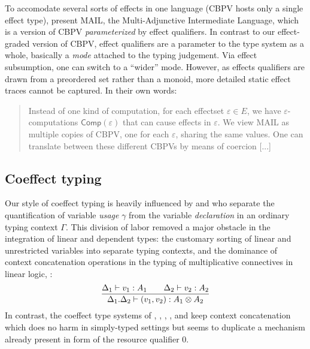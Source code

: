 \documentclass[acmsmall,review,anonymous]{acmart}\settopmatter{printfolios=true,printccs=false,printacmref=false}
\theoremstyle{remark}
\begin{document}
To accomodate several sorts of effects in one language (CBPV hosts
only a single effect type), \citet{kammarPlotkin:popl12} present MAIL,
the Multi-Adjunctive Intermediate Language, which is a version of CBPV
\emph{parameterized} by effect qualifiers.  In contrast to our
effect-graded version of CBPV, effect qualifiers are a parameter to
the type system as a whole, basically a \emph{mode} attached to the
typing judgement.  Via effect subsumption, one can switch to a
``wider'' mode.  However, as effects qualifiers are drawn from a
preordered set rather than a monoid, more detailed static effect
traces cannot be captured.  In their own words:
\begin{quotation}
  Instead of one kind of computation, for each effectset
  $\varepsilon \in E$, we have $\varepsilon$-computations
  $\mathsf{Comp}(\varepsilon)$ that can cause effects in
  \ensuremath{\varepsilon}. We view MAIL as multiple copies of CBPV,
  one for each \ensuremath{\varepsilon}, sharing the same values. One
  can translate between these different CBPVs by means of coercion
  [...]
\end{quotation}


\subsection{Coeffect typing}

Our style of coeffect typing is heavily influenced by
\citet{mcBride:wadler60} and \citet{atkey:lics18} who separate the
quantification of variable \emph{usage} $\gamma$ from the variable
\emph{declaration} in an ordinary typing context $\Gamma$.  This
division of labor removed a major obstacle in the integration of
linear and dependent types: the customary sorting of linear and
unrestricted variables into separate typing contexts, and the
dominance of context concatenation operations in the typing of
multiplicative connectives in linear logic, \eg:
\[
  \dfrac{\Delta_1 \vdash v_1 : A_1 \qquad
      \Delta_2 \vdash v_2 : A_2
    }{\Delta_1.\Delta_2 \vdash (v_1, v_2) : A_1 \otimes A_2}
\]
In contrast, the coeffect type systems of
\citet{reedPierce:icfp10},
\citet{orchard:icfp14},
\citet{brunel:esop14},
\citet{ghicaSmith:esop14}, and
\citet{orchard:icfp19}
keep context concatenation which does no harm in simply-typed settings
but seems to duplicate a mechanism already present in form of the
resource qualifier $0$.
\end{document}

